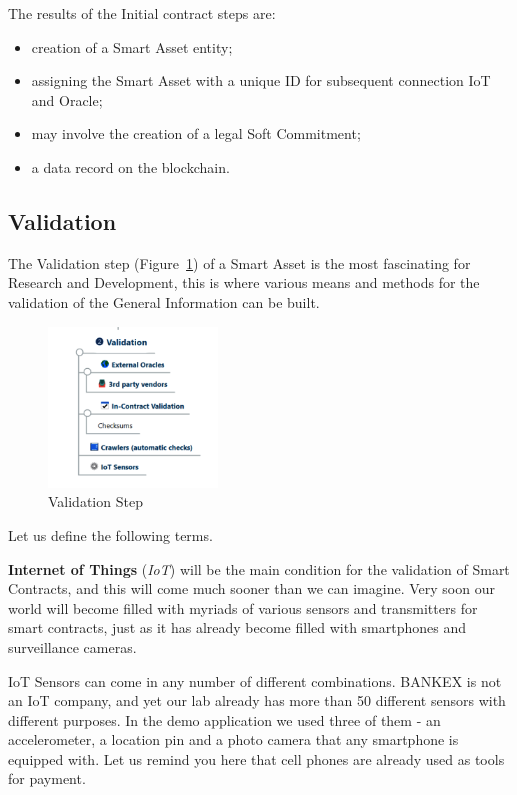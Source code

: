\documentclass{article}
\begin{document}
\begin{multicols}{2}
The results of the Initial contract steps are:

\begin{itemize}
\item creation of a Smart Asset entity;
\item assigning the Smart Asset with a unique ID for subsequent connection IoT and Oracle;
\item may involve the creation of a legal Soft Commitment;
\item a data record on the blockchain.
\end{itemize}

\subsection{Validation}

The Validation step (Figure~\ref{fig:validation}) of a Smart Asset is the most fascinating for Research and Development, this is where various means and methods for the validation of the General Information can be built.

\begin{figure}
  \centering
  \includegraphics[width=0.4\textwidth]{validation.png}
  \caption{Validation Step}
  \label{fig:validation}
\end{figure}

Let us define the following terms.

\textbf{Internet of Things} (\textit{IoT}) will be the main condition for the validation of Smart Contracts, and this will come much sooner than we can imagine. Very soon our world will become filled with myriads of various sensors and transmitters for smart contracts, just as it has already become filled with smartphones and surveillance cameras. 

IoT Sensors can come in any number of different combinations. BANKEX is not an IoT company, and yet our lab already has more than 50 different sensors with different purposes. In the demo application we used three of them - an accelerometer, a location pin and a photo camera that any smartphone is equipped with. Let us remind you here that cell phones are already used as tools for payment. 


\end{multicols}
\end{document}
